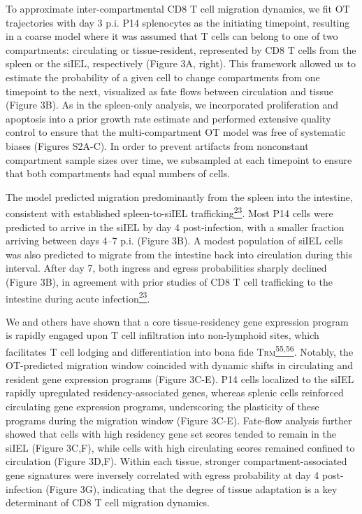 To approximate inter-compartmental CD8 T cell migration dynamics, we fit
OT trajectories with day 3 p.i. P14 splenocytes as the initiating
timepoint, resulting in a coarse model where it was assumed that T cells
can belong to one of two compartments: circulating or tissue-resident,
represented by CD8 T cells from the spleen or the siIEL, respectively
(Figure 3A, right). This framework allowed us to estimate the
probability of a given cell to change compartments from one timepoint to
the next, visualized as fate flows between circulation and tissue
(Figure 3B). As in the spleen-only analysis, we incorporated
proliferation and apoptosis into a prior growth rate estimate and
performed extensive quality control to ensure that the multi-compartment
OT model was free of systematic biases (Figures S2A-C). In order to
prevent artifacts from nonconstant compartment sample sizes over time,
we subsampled at each timepoint to ensure that both compartments had
equal numbers of cells.

The model predicted migration predominantly from the spleen into the
intestine, consistent with established spleen-to-siIEL
trafficking\href{https://sciwheel.com/work/citation?ids=637212\&pre=\&suf=\&sa=0\&dbf=0}{\textsuperscript{23}}.
Most P14 cells were predicted to arrive in the siIEL by day 4
post-infection, with a smaller fraction arriving between days 4--7 p.i.
(Figure 3B). A modest population of siIEL cells was also predicted to
migrate from the intestine back into circulation during this interval.
After day 7, both ingress and egress probabilities sharply declined
(Figure 3B), in agreement with prior studies of CD8 T cell trafficking
to the intestine during acute
infection\href{https://sciwheel.com/work/citation?ids=637212\&pre=\&suf=\&sa=0\&dbf=0}{\textsuperscript{23}}.

We and others have shown that a core tissue-residency gene expression
program is rapidly engaged upon T cell infiltration into non-lymphoid
sites, which facilitates T cell lodging and differentiation into bona
fide
T\textsc{rm}\href{https://sciwheel.com/work/citation?ids=4577165,1395264\&pre=\&pre=\&suf=\&suf=\&sa=0,0\&dbf=0\&dbf=0}{\textsuperscript{55,56}}.
Notably, the OT-predicted migration window coincided with dynamic shifts
in circulating and resident gene expression programs (Figure 3C-E). P14
cells localized to the siIEL rapidly upregulated residency-associated
genes, whereas splenic cells reinforced circulating gene expression
programs, underscoring the plasticity of these programs during the
migration window (Figure 3C-E). Fate-flow analysis further showed that
cells with high residency gene set scores tended to remain in the siIEL
(Figure 3C,F), while cells with high circulating scores remained
confined to circulation (Figure 3D,F). Within each tissue, stronger
compartment-associated gene signatures were inversely correlated with
egress probability at day 4 post-infection (Figure 3G), indicating that
the degree of tissue adaptation is a key determinant of CD8 T cell
migration dynamics.


